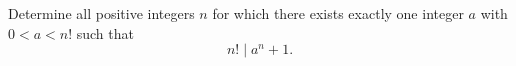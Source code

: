 Determine all positive integers $n$ for which there exists exactly one
integer $a$ with $0<a<n!$ such that
$$n! \mid a^n+1.$$

